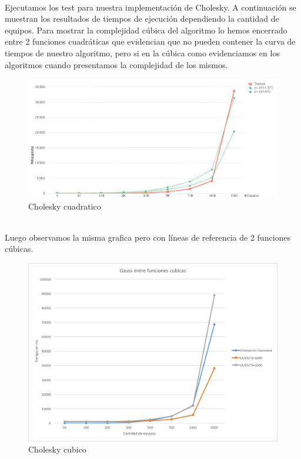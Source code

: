 \\
Ejecutamos los test para nuestra implementación de Cholesky. A continuación se muestran los resultados de tiempos de ejecución dependiendo la cantidad de equipos.
Para mostrar la complejidad cúbica del algoritmo lo hemos encerrado entre 2 funciones cuadráticas que evidencian que no pueden contener la curva de tiempos de nuestro algoritmo, pero si en la cúbica como evidenciamos en los algoritmos cuando presentamos la complejidad de los mismos.\\

\begin{figure}[H]
    \centering
    \includegraphics[width=1\textwidth]{IMG/cholesky cuadratico.png}
    \caption{Cholesky cuadratico}
    \label{fig:Cholesky cuadratico}
\end{figure}

\\

Luego observamos la misma grafica pero con líneas de referencia de 2 funciones cúbicas.\\

\begin{figure}[H]
    \centering
    \includegraphics[width=1\textwidth]{IMG/gaussEntreCubicas.png}
    \caption{Cholesky cubico}
    \label{fig:Cholesky cubico}
\end{figure}

